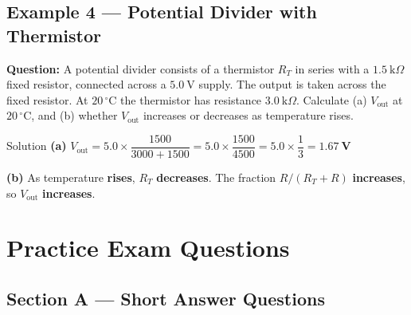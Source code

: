 \pagebreak

\subsection*{Example 4 — Potential Divider with Thermistor}

\textbf{Question:} A potential divider consists of a thermistor $R_T$ in series with a $1.5\ \text{k}\Omega$ fixed resistor, connected across a $5.0\ \text{V}$ supply. The output is taken across the fixed resistor. At $20\,^\circ\text{C}$ the thermistor has resistance $3.0\ \text{k}\Omega$. Calculate (a) $V_{\text{out}}$ at $20\,^\circ\text{C}$, and (b) whether $V_{\text{out}}$ increases or decreases as temperature rises.

\begin{examplebox}{Solution}
\textbf{(a)} \quad $V_{\text{out}} = 5.0 \times \dfrac{1500}{3000 + 1500} = 5.0 \times \dfrac{1500}{4500} = 5.0 \times \dfrac{1}{3} = \mathbf{1.67\ \text{V}}$

\vspace{0.3em}
\textbf{(b)} As temperature \textbf{rises}, $R_T$ \textbf{decreases}. The fraction $R/(R_T + R)$ \textbf{increases}, so $V_{\text{out}}$ \textbf{increases}.
\end{examplebox}


\pagebreak

\section{Practice Exam Questions}

\subsection*{Section A — Short Answer Questions}

